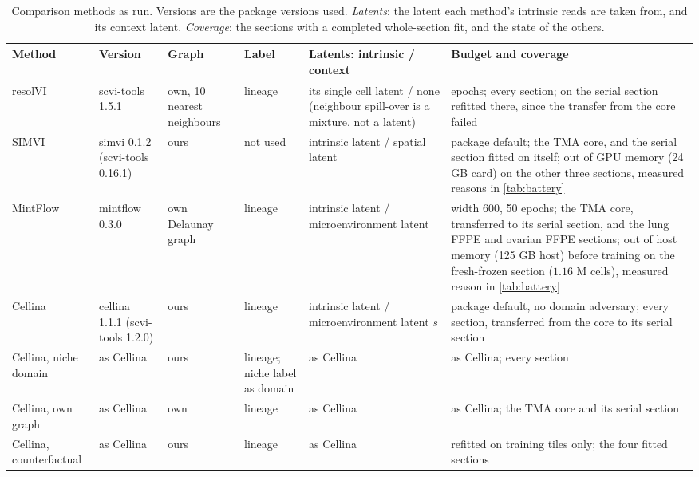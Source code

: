 \begin{table}[t]
\centering
\caption{Comparison methods as run. Versions are the package versions used. \emph{Latents}: the latent each method's intrinsic reads are taken from, and its context latent. \emph{Coverage}: the sections with a completed whole-section fit, and the state of the others.}
\label{tab:baselines}
\small
\setlength{\tabcolsep}{4pt}
\begin{tabular}{@{}>{\raggedright\arraybackslash}p{}>{\raggedright\arraybackslash}p{}>{\raggedright\arraybackslash}p{}>{\raggedright\arraybackslash}p{}>{\raggedright\arraybackslash}p{}>{\raggedright\arraybackslash}p{}@{}}
\toprule
Method & Version & Graph & Label & Latents: intrinsic / context & Budget and coverage \\
\midrule
resolVI & scvi-tools 1.5.1 & own, 10 nearest neighbours & lineage & its single cell latent / none (neighbour spill-over is a mixture, not a latent) & 50 epochs; every section; on the serial section refitted there, since the transfer from the core failed \\
SIMVI & simvi 0.1.2 (scvi-tools 0.16.1) & ours & not used & intrinsic latent / spatial latent & package default; the TMA core, and the serial section fitted on itself; out of GPU memory (24 GB card) on the other three sections, measured reasons in \cref{tab:battery} \\
MintFlow & mintflow 0.3.0 & own Delaunay graph & lineage & intrinsic latent / microenvironment latent & width 600, 50 epochs; the TMA core, transferred to its serial section, and the lung FFPE and ovarian FFPE sections; out of host memory (125 GB host) before training on the fresh-frozen section ($1.16$ M cells), measured reason in \cref{tab:battery} \\
Cellina & cellina 1.1.1 (scvi-tools 1.2.0) & ours & lineage & intrinsic latent / microenvironment latent $s$ & package default, no domain adversary; every section, transferred from the core to its serial section \\
Cellina, niche domain & as Cellina & ours & lineage; niche label as domain & as Cellina & as Cellina; every section \\
Cellina, own graph & as Cellina & own & lineage & as Cellina & as Cellina; the TMA core and its serial section \\
Cellina, counterfactual & as Cellina & ours & lineage & as Cellina & refitted on training tiles only; the four fitted sections \\
\bottomrule
\end{tabular}
\end{table}

